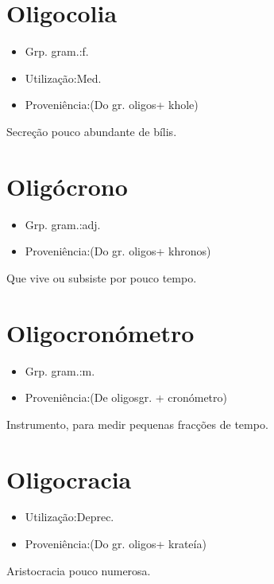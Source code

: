 \section{Oligocolia}
\begin{itemize}
\item {Grp. gram.:f.}
\end{itemize}
\begin{itemize}
\item {Utilização:Med.}
\end{itemize}
\begin{itemize}
\item {Proveniência:(Do gr. \textunderscore oligos\textunderscore  + \textunderscore khole\textunderscore )}
\end{itemize}
Secreção pouco abundante de bílis.
\section{Oligócrono}
\begin{itemize}
\item {Grp. gram.:adj.}
\end{itemize}
\begin{itemize}
\item {Proveniência:(Do gr. \textunderscore oligos\textunderscore  + \textunderscore khronos\textunderscore )}
\end{itemize}
Que vive ou subsiste por pouco tempo.
\section{Oligocronómetro}
\begin{itemize}
\item {Grp. gram.:m.}
\end{itemize}
\begin{itemize}
\item {Proveniência:(De \textunderscore oligos\textunderscore  gr. + \textunderscore cronómetro\textunderscore )}
\end{itemize}
Instrumento, para medir pequenas fracções de tempo.
\section{Oligocracia}
\begin{itemize}
\item {Utilização:Deprec.}
\end{itemize}
\begin{itemize}
\item {Proveniência:(Do gr. \textunderscore oligos\textunderscore  + \textunderscore krateía\textunderscore )}
\end{itemize}
Aristocracia pouco numerosa.
